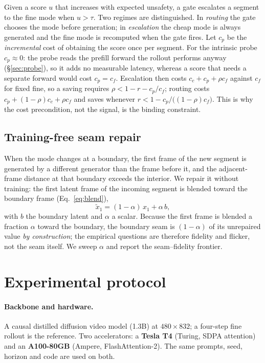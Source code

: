 \documentclass[review]{cas-sc}          %
\begin{document}
Given a score $u$ that increases with expected unsafety, a gate escalates a segment to the fine mode when
$u > \tau$. Two regimes are distinguished. In \emph{routing} the gate chooses the mode before generation;
in \emph{escalation} the cheap mode is always generated and the fine mode is recomputed when the gate
fires. Let $c_p$ be the \emph{incremental} cost of obtaining the score once per segment. For the intrinsic
probe $c_p \approx 0$: the probe reads the prefill forward the rollout performs anyway (\S\ref{sec:probe}),
so it adds no measurable latency, whereas a score that needs a separate forward would cost $c_p = c_f$.
Escalation then costs $c_c + c_p + \rho c_f$ against $c_f$ for fixed fine, so a saving requires
$\rho < 1 - r - c_p/c_f$; routing costs $c_p + (1-\rho)c_c + \rho c_f$ and saves whenever
$r < 1 - c_p/\bigl((1-\rho)c_f\bigr)$. This is why the cost precondition, not the signal, is the binding
constraint.

\subsection{Training-free seam repair}
\label{sec:seam}

When the mode changes at a boundary, the first frame of the new segment is generated by a different
generator than the frame before it, and the adjacent-frame distance at that boundary exceeds the
interior. We repair it without training: the first latent frame of the incoming segment is blended toward
the boundary frame (Eq.~\eqref{eq:blend}),
\begin{equation}
\tilde{x}_1 = (1-\alpha)\,x_1 + \alpha\,b ,
\label{eq:blend}
\end{equation}
with $b$ the boundary latent and $\alpha$ a scalar. Because the first frame is blended a fraction
$\alpha$ toward the boundary, the boundary seam is $(1-\alpha)$ of its unrepaired value \emph{by
construction}; the empirical questions are therefore fidelity and flicker, not the seam itself. We sweep
$\alpha$ and report the seam--fidelity frontier.

\section{Experimental protocol}
\label{sec:protocol}

\paragraph{Backbone and hardware.}
A causal distilled diffusion video model (1.3B) at $480\times832$; a four-step fine rollout is the
reference. Two accelerators: a \textbf{Tesla T4} (Turing, SDPA attention) and an
\textbf{A100-80GB} (Ampere, FlashAttention-2). The same prompts, seed, horizon and code are used on both.
\end{document}
